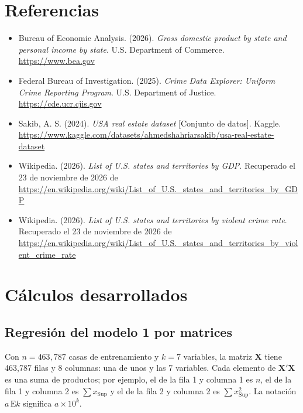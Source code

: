 \documentclass[12pt,letterpaper]{article}
\begin{document}
\section*{Referencias}
\begin{itemize}[leftmargin=*,label={}]
  \item Bureau of Economic Analysis. (2026). \emph{Gross domestic product by state and personal income by state}. U.S. Department of Commerce. \url{https://www.bea.gov}
  \item Federal Bureau of Investigation. (2025). \emph{Crime Data Explorer: Uniform Crime Reporting Program}. U.S. Department of Justice. \url{https://cde.ucr.cjis.gov}
  \item Sakib, A. S. (2024). \emph{USA real estate dataset} [Conjunto de datos]. Kaggle. \url{https://www.kaggle.com/datasets/ahmedshahriarsakib/usa-real-estate-dataset}
  \item Wikipedia. (2026). \emph{List of U.S. states and territories by GDP}. Recuperado el 23 de noviembre de 2026 de \url{https://en.wikipedia.org/wiki/List_of_U.S._states_and_territories_by_GDP}
  \item Wikipedia. (2026). \emph{List of U.S. states and territories by violent crime rate}. Recuperado el 23 de noviembre de 2026 de \url{https://en.wikipedia.org/wiki/List_of_U.S._states_and_territories_by_violent_crime_rate}
\end{itemize}

\clearpage
\appendix
\section{Cálculos desarrollados}\label{sec:anexo}

\subsection{Regresión del modelo 1 por matrices}

Con $n = 463,787$ casas de entrenamiento y $k = 7$ variables, la matriz $\mathbf{X}$ tiene 463,787 filas y 8 columnas: una de unos y las 7 variables. Cada elemento de $\mathbf{X}'\mathbf{X}$ es una suma de productos; por ejemplo, el de la fila 1 y columna 1 es $n$, el de la fila 1 y columna 2 es $\sum x_{\text{Sup}}$ y el de la fila 2 y columna 2 es $\sum x_{\text{Sup}}^2$. La notación $a\,\mathrm{E}k$ significa $a \times 10^k$.
\end{document}
